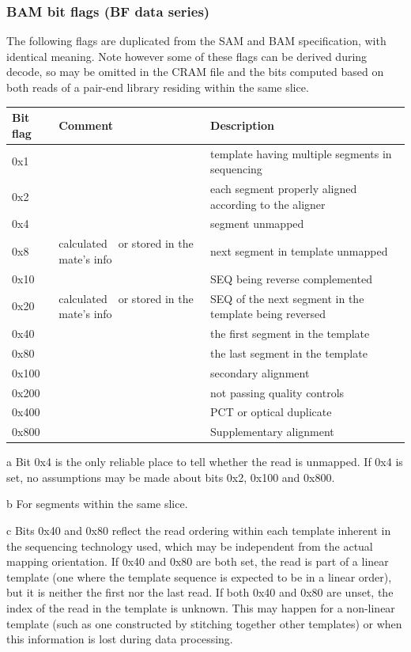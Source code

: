 \documentclass[a4paper]{article}
\begin{document}
\subsubsection*{\textbf{BAM bit flags (BF data series)}}

The following flags are duplicated from the SAM and BAM specification, with identical meaning.
Note however some of these flags can be derived during decode, so may be omitted in the CRAM file and the bits computed based on both reads of a pair-end library residing within the same slice.

\begin{threeparttable}[t]
\begin{tabular}{|>{\raggedright}p{144pt}|>{\raggedright}p{144pt}|>{\raggedright}p{144pt}|}
\hline
\textbf{Bit flag} & \textbf{Comment} & \textbf{Description}\tabularnewline
\hline
0x1 &  & template having multiple segments in sequencing\tabularnewline
\hline
0x2 &  & each segment properly aligned according to the aligner\tabularnewline
\hline
0x4 &  & segment unmapped\tnote{a}\tabularnewline
\hline
0x8 & calculated\tnote{b}\ \ or stored in the mate's info & next segment in template unmapped\tabularnewline
\hline
0x10 &  & SEQ being reverse complemented\tabularnewline
\hline
0x20 & calculated\tnote{b}\ \ or stored in the mate's info & SEQ of the next segment in the
template being reversed\tabularnewline
\hline
0x40 &  & the first segment in the template\tnote{c}\tabularnewline
\hline
0x80 &  & the last segment in the template\tnote{c}\tabularnewline
\hline
0x100 &  & secondary alignment\tabularnewline
\hline
0x200 &  & not passing quality controls\tabularnewline
\hline
0x400 &  & PCT or optical duplicate\tabularnewline
\hline
0x800 &  & Supplementary alignment\tabularnewline
\hline
\end{tabular}
\begin{tablenotes}
\item[a] Bit 0x4 is the only reliable place to tell whether the read is unmapped.  If 0x4 is set, no assumptions may be made about bits 0x2, 0x100 and 0x800.
\item[b] For segments within the same slice.
\item[c] Bits 0x40 and 0x80 reflect the read ordering within each template inherent in the sequencing technology used, which may be independent from the actual mapping orientation.
If 0x40 and 0x80 are both set, the read is part of a linear template (one where the template sequence is expected to be in a linear order), but it is neither the first nor the last read.
If both 0x40 and 0x80 are unset, the index of the read in the template is unknown.
This may happen for a non-linear template (such as one constructed by stitching together other templates) or when this information is lost during data processing.
\end{tablenotes}
\end{threeparttable}
\end{document}
